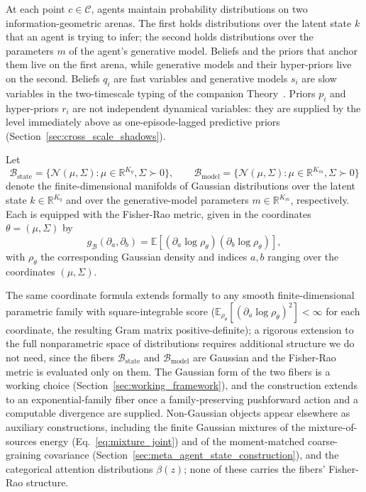 At each point $c \in \mathcal{C}$, agents maintain probability distributions on two information-geometric arenas. The first holds distributions over the latent state $k$ that an agent is trying to infer; the second holds distributions over the parameters $m$ of the agent's generative model. Beliefs and the priors that anchor them live on the first arena, while generative models and their hyper-priors live on the second. Beliefs $q_i$ are fast variables and generative models $s_i$ are slow variables in the two-timescale typing of the companion Theory~\cite[Ch.~8]{DennisGaugeVFE2026}. Priors $p_i$ and hyper-priors $r_i$ are not independent dynamical variables: they are supplied by the level immediately above as one-episode-lagged predictive priors (Section~\ref{sec:cross_scale_shadows}).

\begin{definition}
Let
\begin{equation}
\mathcal{B}_{\mathrm{state}} = \{\mathcal{N}(\mu, \Sigma) : \mu \in \mathbb{R}^{K_q}, \Sigma \succ 0\},
\qquad
\mathcal{B}_{\mathrm{model}} = \{\mathcal{N}(\mu, \Sigma) : \mu \in \mathbb{R}^{K_m}, \Sigma \succ 0\}
\end{equation}
denote the finite-dimensional manifolds of Gaussian distributions over the latent state $k \in \mathbb{R}^{K_q}$ and over the generative-model parameters $m \in \mathbb{R}^{K_m}$, respectively. Each is equipped with the Fisher-Rao metric, given in the coordinates $\theta = (\mu, \Sigma)$ by
\begin{equation}
g_{\mathcal{B}}(\partial_a, \partial_b) = \mathbb{E}\left[(\partial_a \log \rho_\theta)(\partial_b \log \rho_\theta)\right],
\end{equation}
with $\rho_\theta$ the corresponding Gaussian density and indices $a, b$ ranging over the coordinates $(\mu, \Sigma)$.
\end{definition}

The same coordinate formula extends formally to any smooth finite-dimensional parametric family with square-integrable score ($\mathbb{E}_{\rho_\theta}[(\partial_a \log\rho_\theta)^2] < \infty$ for each coordinate, the resulting Gram matrix positive-definite); a rigorous extension to the full nonparametric space of distributions requires additional structure we do not need, since the fibers $\mathcal{B}_{\mathrm{state}}$ and $\mathcal{B}_{\mathrm{model}}$ are Gaussian and the Fisher-Rao metric is evaluated only on them. The Gaussian form of the two fibers is a working choice (Section~\ref{sec:working_framework}), and the construction extends to an exponential-family fiber once a family-preserving pushforward action and a computable divergence are supplied. Non-Gaussian objects appear elsewhere as auxiliary constructions, including the finite Gaussian mixtures of the mixture-of-sources energy (Eq.~\eqref{eq:mixture_joint}) and of the moment-matched coarse-graining covariance (Section~\ref{sec:meta_agent_state_construction}), and the categorical attention distributions $\beta(z)$; none of these carries the fibers' Fisher-Rao structure.

